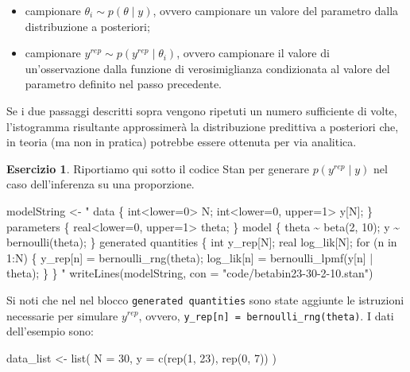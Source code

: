 \documentclass[
  11pt,
]{krantz}
\makeatletter
\newenvironment{Shaded}{\begin{snugshade}}{\end{snugshade}}
\newcommand{\AttributeTok}[1]{\textcolor[rgb]{0.61,0.61,0.61}{#1}}
\newcommand{\DecValTok}[1]{\textcolor[rgb]{0.06,0.06,0.06}{#1}}
\newcommand{\FunctionTok}[1]{\textcolor[rgb]{0,0,0}{#1}}
\newcommand{\NormalTok}[1]{#1}
\newcommand{\OtherTok}[1]{\textcolor[rgb]{0.37,0.37,0.37}{#1}}
\newcommand{\StringTok}[1]{\textcolor[rgb]{0.5,0.5,0.5}{#1}}
\providecommand{\tightlist}{%
  \setlength{\itemsep}{0pt}\setlength{\parskip}{0pt}}
\newenvironment{kframe}{%
\medskip{}
\setlength{\fboxsep}{.8em}
 \def\at@end@of@kframe{}%
 \ifinner\ifhmode%
  \def\at@end@of@kframe{\end{minipage}}%
  \begin{minipage}{\columnwidth}%
 \fi\fi%
 \def\FrameCommand##1{\hskip\@totalleftmargin \hskip-\fboxsep
 \colorbox{shadecolor}{##1}\hskip-\fboxsep
     \hskip-\linewidth \hskip-\@totalleftmargin \hskip\columnwidth}%
 \MakeFramed {\advance\hsize-\width
   \@totalleftmargin\z@ \linewidth\hsize
   \@setminipage}}%
 {\par\unskip\endMakeFramed%
 \at@end@of@kframe}
\renewenvironment{Shaded}{\begin{kframe}}{\end{kframe}}
\theoremstyle{definition}
\theoremstyle{definition}
\theoremstyle{definition}
\newtheorem{exercise}{Esercizio}[chapter]
\theoremstyle{definition}
\theoremstyle{remark}
\makeatother
\begin{document}
\begin{itemize}
\tightlist
\item
  campionare \(\theta_i \sim p(\theta \mid y)\), ovvero campionare un valore del parametro dalla distribuzione a posteriori;
\item
  campionare \(y^{rep} \sim p(y^{rep} \mid \theta_i)\), ovvero campionare il valore di un'osservazione dalla funzione di verosimiglianza condizionata al valore del parametro definito nel passo precedente.
\end{itemize}

Se i due passaggi descritti sopra vengono ripetuti un numero sufficiente di volte, l'istogramma risultante approssimerà la distribuzione predittiva a posteriori che, in teoria (ma non in pratica) potrebbe essere ottenuta per via analitica.

\begin{exercise}
Riportiamo qui sotto il codice Stan per generare \(p(y^{rep} \mid y)\) nel caso dell'inferenza su una proporzione.

\begin{Shaded}
\begin{Highlighting}[]
\NormalTok{modelString }\OtherTok{\textless{}{-}} \StringTok{"}
\StringTok{data \{}
\StringTok{  int\textless{}lower=0\textgreater{} N;}
\StringTok{  int\textless{}lower=0, upper=1\textgreater{} y[N];}
\StringTok{\}}
\StringTok{parameters \{}
\StringTok{  real\textless{}lower=0, upper=1\textgreater{} theta;}
\StringTok{\}}
\StringTok{model \{}
\StringTok{  theta \textasciitilde{} beta(2, 10);}
\StringTok{  y \textasciitilde{} bernoulli(theta);}
\StringTok{\}}
\StringTok{generated quantities \{}
\StringTok{  int y\_rep[N];}
\StringTok{  real log\_lik[N];}
\StringTok{  for (n in 1:N) \{}
\StringTok{    y\_rep[n] = bernoulli\_rng(theta);}
\StringTok{    log\_lik[n] = bernoulli\_lpmf(y[n] | theta);}
\StringTok{  \}}
\StringTok{\}}
\StringTok{"}
\FunctionTok{writeLines}\NormalTok{(modelString, }\AttributeTok{con =} \StringTok{"code/betabin23{-}30{-}2{-}10.stan"}\NormalTok{)}
\end{Highlighting}
\end{Shaded}

\noindent Si noti che nel nel blocco \texttt{generated\ quantities} sono state aggiunte le istruzioni necessarie per simulare \(y^{rep}\), ovvero, \texttt{y\_rep{[}n{]}\ =\ bernoulli\_rng(theta)}. I dati dell'esempio sono:

\begin{Shaded}
\begin{Highlighting}[]
\NormalTok{data\_list }\OtherTok{\textless{}{-}} \FunctionTok{list}\NormalTok{(}
  \AttributeTok{N =} \DecValTok{30}\NormalTok{,}
  \AttributeTok{y =} \FunctionTok{c}\NormalTok{(}\FunctionTok{rep}\NormalTok{(}\DecValTok{1}\NormalTok{, }\DecValTok{23}\NormalTok{), }\FunctionTok{rep}\NormalTok{(}\DecValTok{0}\NormalTok{, }\DecValTok{7}\NormalTok{))}
\NormalTok{)}
\end{Highlighting}
\end{Shaded}


\end{exercise}
\end{document}
